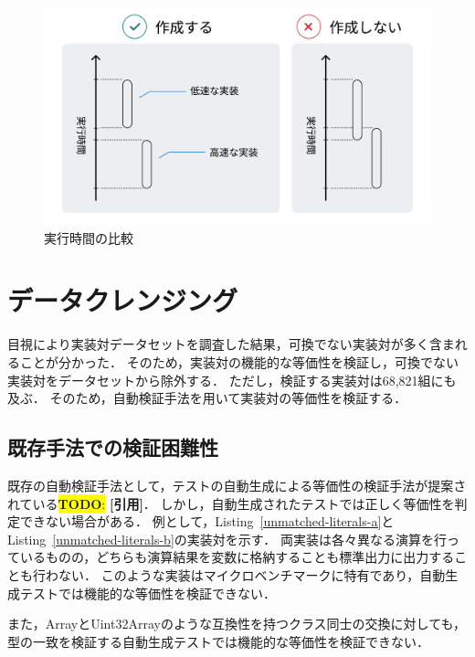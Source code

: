 \documentclass[11pt]{jreport}
\newcommand{\todo}[1]{\colorbox{yellow}{{\bf TODO}:}{\color{red} {\textbf{[#1]}}}}
\begin{document}
\begin{figure}[t]
\centerline{\includegraphics[width=0.768\linewidth]{Omori_fig/compare.pdf}}
\caption{実行時間の比較}
\label{fig-dummy}
\end{figure}


\newpage




\section{データクレンジング}\label{chapter:dataset:clean}


目視により実装対データセットを調査した結果，可換でない実装対が多く含まれることが分かった．
そのため，実装対の機能的な等価性を検証し，可換でない実装対をデータセットから除外する．
ただし，検証する実装対は68,821組にも及ぶ．
そのため，自動検証手法を用いて実装対の等価性を検証する．




\subsection{既存手法での検証困難性}


既存の自動検証手法として，テストの自動生成による等価性の検証手法が提案されている\todo{引用}．
しかし，自動生成されたテストでは正しく等価性を判定できない場合がある．
例として，Listing~\ref{unmatched-literals-a}とListing~\ref{unmatched-literals-b}の実装対を示す．
両実装は各々異なる演算を行っているものの，どちらも演算結果を変数に格納することも標準出力に出力することも行わない．
このような実装はマイクロベンチマークに特有であり，自動生成テストでは機能的な等価性を検証できない．

また，ArrayとUint32Arrayのような互換性を持つクラス同士の交換に対しても，型の一致を検証する自動生成テストでは機能的な等価性を検証できない．
\end{document}
